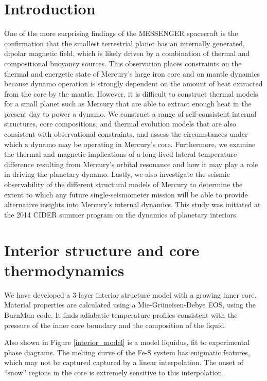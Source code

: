 \documentclass[landscape,a0b,final]{a0poster}
\begin{document}
\begin{multicols}{3}

\section*{Introduction}

One of the more surprising findings of the MESSENGER spacecraft is the confirmation that the smallest terrestrial planet has an internally generated, dipolar magnetic field, which is likely driven by a combination of thermal and compositional buoyancy sources. 
This observation places constraints on the thermal and energetic state of Mercury’s large iron core and on mantle dynamics because dynamo operation is strongly dependent on the amount of heat extracted from the core by the mantle.
However, it is difficult to construct thermal models for a small planet such as Mercury that are able to extract enough heat in the present day to power a dynamo. 
We construct a range of self-consistent internal structures, core compositions, and thermal evolution models that are also consistent with observational constraints, and assess the circumstances under which a dynamo may be operating in Mercury’s core. 
Furthermore, we examine the thermal and magnetic implications of a long-lived lateral temperature difference resulting from Mercury’s orbital resonance and how it may play a role in driving the planetary dynamo. 
Lastly, we also investigate the seismic observability of the different structural models of Mercury to determine the extent to which any future single-seismometer mission will be able to provide alternative insights into Mercury's internal dynamics.
This study was initiated at the 2014 CIDER summer program on the dynamics of planetary interiors.


\section*{Interior structure and core thermodynamics}

We have developed a 3-layer interior structure model with a growing inner core.
Material properties are calculated using a Mie-Gr\"{u}neisen-Debye EOS, using the BurnMan
code. It finds adiabatic temperature profiles consistent with the pressure of the 
inner core boundary and the composition of the liquid. 

Also shown in Figure \ref{interior_model} is a model liquidus, fit to experimental
phase diagrams. The melting curve of the Fe-S system has enigmatic features, which
may not be captured captured by a  linear interpolation. The onset of ``snow''
regions in the core is extremely sensitive to this interpolation.


\end{multicols}
\end{document}
